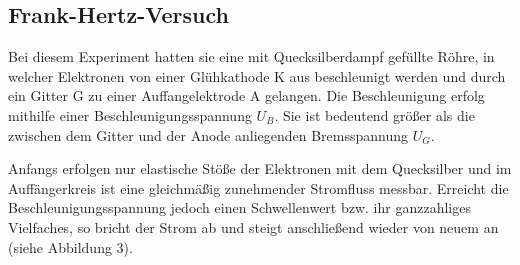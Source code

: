 \documentclass{article}
\begin{document}
{\begin{center}
\begin{minipage}{\linewidth}
\centering
{}
%
\label{term}
\end{minipage}
\end{center}

\subsection{Frank-Hertz-Versuch}
\begin{center}
\begin{minipage}{\linewidth}
\centering
{}
%
\label{skizze}
\end{minipage}
\end{center}
Bei diesem Experiment hatten sie eine mit Quecksilberdampf gefüllte Röhre, in welcher Elektronen von einer Glühkathode K aus beschleunigt werden und durch ein Gitter G zu einer Auffangelektrode A gelangen. Die Beschleunigung erfolg mithilfe einer Beschleunigungsspannung \(U_B\). Sie ist bedeutend größer als die zwischen dem Gitter und der Anode anliegenden Bremsspannung \(U_G\).


Anfangs erfolgen nur elastische Stöße der Elektronen mit dem Quecksilber und im Auffängerkreis ist eine gleichmäßig zunehmender Stromfluss messbar. Erreicht die Beschleunigungsspannung jedoch einen Schwellenwert bzw. ihr ganzzahliges Vielfaches, so bricht der Strom ab und steigt anschließend wieder von neuem an (siehe Abbildung 3).


}
\end{document}
